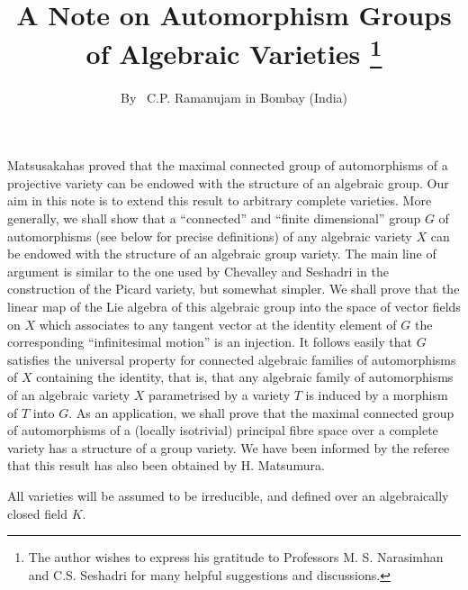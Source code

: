 \title{A Note on Automorphism Groups of Algebraic Varieties \footnote{The author wishes to express his gratitude to Professors M. S. Narasimhan and C.S. Seshadri for many helpful suggestions and discussions.}}\label{art6}


\author{By~ C.P. Ramanujam in Bombay (India)}

\date{}
\maketitle

\setcounter{page}{73}
\setcounter{pageoriginal}{54}
Matsusaka\pageoriginale has proved \cite{art6-key3} that the maximal connected group of automorphisms of a projective variety can be endowed with the structure of an algebraic group. Our aim in this note is to extend this result to arbitrary complete varieties. More generally, we shall show that a ``connected'' and ``finite dimensional'' group $G$ of automorphisms (see below for precise definitions) of any algebraic variety $X$ can be endowed with the structure of an algebraic group variety. The main line of argument is similar to the one used by Chevalley \cite{art6-key2} and Seshadri \cite{art6-key7} in the construction of the Picard variety, but somewhat simpler. We shall prove that the linear map of the Lie algebra of this algebraic group  into the space of vector fields on $X$ which associates to any tangent vector at the identity element of $G$ the corresponding ``infinitesimal motion'' is an injection. It follows easily that $G$ satisfies the universal property for connected algebraic families of automorphisms of $X$ containing the identity, that is, that any algebraic family of automorphisms of an algebraic variety $X$ parametrised by a variety $T$ is induced by a morphism of $T$ into $G$. As an application, we shall prove that the maximal connected group of automorphisms of a (locally isotrivial) principal fibre space over a complete variety has a structure of a group variety. We have been informed by the referee that this result has also been obtained by H. Matsumura.

All varieties will be assumed to be irreducible, and defined over an algebraically closed field $K$.

